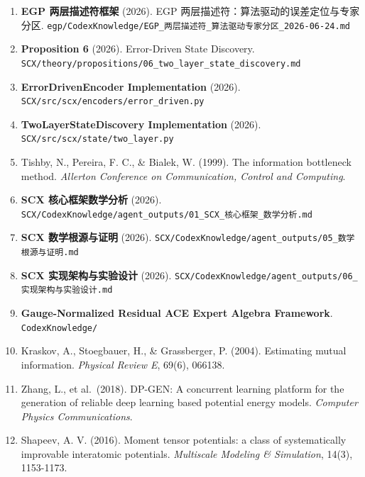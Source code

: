 \documentclass[
  12pt,
]{ctexart}
\providecommand{\tightlist}{%
  \setlength{\itemsep}{0pt}\setlength{\parskip}{0pt}}
\begin{document}
\begin{enumerate}
\def\labelenumi{\arabic{enumi}.}
\tightlist
\item
  \textbf{EGP 两层描述符框架} (2026). EGP
  两层描述符：算法驱动的误差定位与专家分区.
  \texttt{egp/CodexKnowledge/EGP\_两层描述符\_算法驱动专家分区\_2026-06-24.md}
\item
  \textbf{Proposition 6} (2026). Error-Driven State Discovery.
  \texttt{SCX/theory/propositions/06\_two\_layer\_state\_discovery.md}
\item
  \textbf{ErrorDrivenEncoder Implementation} (2026).
  \texttt{SCX/src/scx/encoders/error\_driven.py}
\item
  \textbf{TwoLayerStateDiscovery Implementation} (2026).
  \texttt{SCX/src/scx/state/two\_layer.py}
\item
  Tishby, N., Pereira, F. C., \& Bialek, W. (1999). The information
  bottleneck method. \emph{Allerton Conference on Communication, Control
  and Computing}.
\item
  \textbf{SCX 核心框架数学分析} (2026).
  \texttt{SCX/CodexKnowledge/agent\_outputs/01\_SCX\_核心框架\_数学分析.md}
\item
  \textbf{SCX 数学根源与证明} (2026).
  \texttt{SCX/CodexKnowledge/agent\_outputs/05\_数学根源与证明.md}
\item
  \textbf{SCX 实现架构与实验设计} (2026).
  \texttt{SCX/CodexKnowledge/agent\_outputs/06\_实现架构与实验设计.md}
\item
  \textbf{Gauge-Normalized Residual ACE Expert Algebra Framework}.
  \texttt{CodexKnowledge/}
\item
  Kraskov, A., Stoegbauer, H., \& Grassberger, P. (2004). Estimating
  mutual information. \emph{Physical Review E}, 69(6), 066138.
\item
  Zhang, L., et al.~(2018). DP-GEN: A concurrent learning platform for
  the generation of reliable deep learning based potential energy
  models. \emph{Computer Physics Communications}.
\item
  Shapeev, A. V. (2016). Moment tensor potentials: a class of
  systematically improvable interatomic potentials. \emph{Multiscale
  Modeling \& Simulation}, 14(3), 1153-1173.
\end{enumerate}
\end{document}
